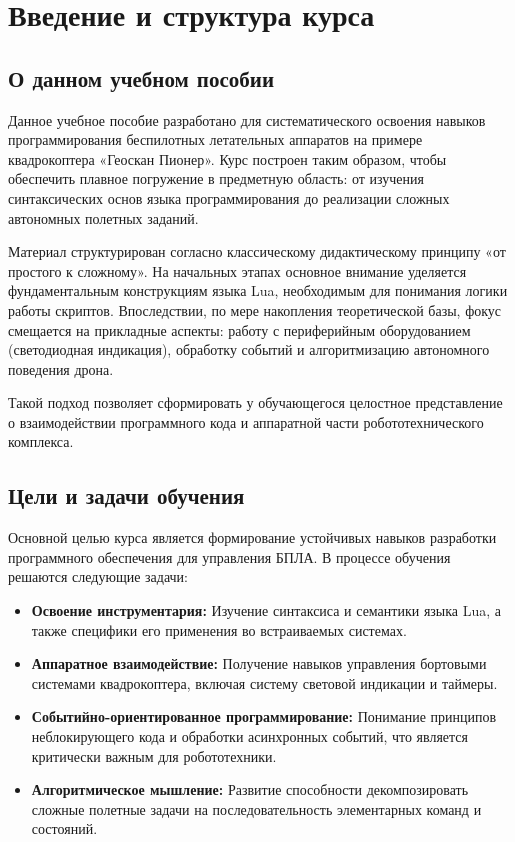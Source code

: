 \section{Введение и структура курса}

\subsection*{О данном учебном пособии}

Данное учебное пособие разработано для систематического освоения навыков программирования беспилотных летательных аппаратов на примере квадрокоптера «Геоскан Пионер». Курс построен таким образом, чтобы обеспечить плавное погружение в предметную область: от изучения синтаксических основ языка программирования до реализации сложных автономных полетных заданий.

Материал структурирован согласно классическому дидактическому принципу «от простого к сложному». На начальных этапах основное внимание уделяется фундаментальным конструкциям языка Lua, необходимым для понимания логики работы скриптов. Впоследствии, по мере накопления теоретической базы, фокус смещается на прикладные аспекты: работу с периферийным оборудованием (светодиодная индикация), обработку событий и алгоритмизацию автономного поведения дрона.

Такой подход позволяет сформировать у обучающегося целостное представление о взаимодействии программного кода и аппаратной части робототехнического комплекса.

\subsection*{Цели и задачи обучения}

Основной целью курса является формирование устойчивых навыков разработки программного обеспечения для управления БПЛА. В процессе обучения решаются следующие задачи:

\begin{itemize}
    \item \textbf{Освоение инструментария:} Изучение синтаксиса и семантики языка Lua, а также специфики его применения во встраиваемых системах.
    \item \textbf{Аппаратное взаимодействие:} Получение навыков управления бортовыми системами квадрокоптера, включая систему световой индикации и таймеры.
    \item \textbf{Событийно-ориентированное программирование:} Понимание принципов неблокирующего кода и обработки асинхронных событий, что является критически важным для робототехники.
    \item \textbf{Алгоритмическое мышление:} Развитие способности декомпозировать сложные полетные задачи на последовательность элементарных команд и состояний.
\end{itemize}

